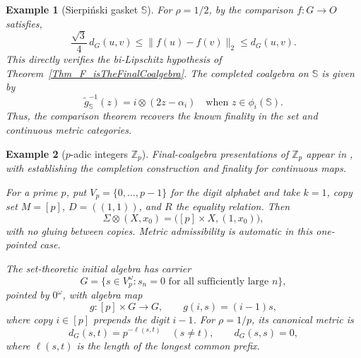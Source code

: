 \documentclass{sn-jnl}%
\theoremstyle{thmstyleone}%
\theoremstyle{thmstyletwo}%
\newtheorem{example}{Example}%
\theoremstyle{thmstylethree}%
\newcommand{\M}{\Sigma}
\newcommand{\F}{\M\otimes}
\newcommand{\g}{\tilde{g}^{-1}}
\newcommand{\f}{\phi}
\newcommand{\Ss}{\mathbb{S}}
\begin{document}
\begin{example}[Sierpiński gasket $\Ss$]
    For $\rho=1/2$, by \cite[Theorem~19]{Bhat} the comparison $f:G\to O$ satisfies, 
    \begin{equation} 
    \nonumber
        \frac{\sqrt3}{4}\,d_G(u,v) \leq \|f(u)-f(v)\|_2 \leq d_G(u,v).
    \end{equation}
    This directly verifies the bi-Lipschitz hypothesis of Theorem~\ref{Thm_F_isTheFinalCoalgebra}. The completed coalgebra on $\Ss$ is given by 
    \begin{equation} 
    \nonumber
        \g_{\Ss}(z)=i\otimes(2z-\alpha_i) \quad \text{when } z\in\f_i(\Ss).
    \end{equation}
    Thus, the comparison theorem recovers the known finality in the set and continuous metric categories.
\end{example}

\begin{example}[$p$-adic integers $\mathbb Z_p$]
\label{Ex_p_adic}
    Final-coalgebra presentations of $\mathbb Z_p$ appear in \cite{Bhatpadic,Mano}, with \cite{Mano} establishing the completion construction and finality for continuous maps.
    
    For a prime $p$, put $V_p=\{0,\ldots,p-1\}$ for the digit alphabet and take $k=1$, copy set $M=[p]$, $D=((1,1))$, and $R$ the equality relation. Then
    \begin{equation} 
    \nonumber
        \F(X,x_0)=\bigl([p]\times X,(1,x_0)\bigr),
    \end{equation}
    with no gluing between copies. Metric admissibility is automatic in this one-pointed case.
    
    The set-theoretic initial algebra has carrier
    \begin{equation} 
    \nonumber
     G=\{s\in V_p^\omega:
           s_n=0\text{ for all sufficiently large }n\},
    \end{equation}
    pointed by $0^\omega$, with algebra map
    \begin{equation} 
    \nonumber
        g:[p]\times G\longrightarrow G,\qquad g(i,s)=(i-1)s,
    \end{equation}
    where copy $i\in[p]$ prepends the digit $i-1$. For $\rho=1/p$, its canonical metric is
    \begin{equation} 
    \nonumber
        d_G(s,t)=p^{-\ell(s,t)}\quad(s\ne t), \qquad d_G(s,s)=0,
    \end{equation}
    where $\ell(s,t)$ is the length of the longest common prefix.
    

\end{example}
\end{document}
